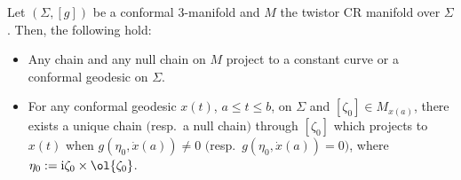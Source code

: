 \begin{Theorem}\label{chain-projection}
Let $(\Sigma, [g])$ be a conformal $3$-manifold and $M$ the twistor CR manifold over $\Sigma$. Then, the following hold:
\begin{itemize}\itemsep=0pt
\item[$(1)$] Any chain and any null chain on $M$ project to a constant curve or a conformal geodesic on $\Sigma$.
\item[$(2)$] For any conformal geodesic $x(t)$, $a\le t\le b$, on $\Sigma$ and $[\zeta_0]\in M_{x(a)}$, there exists a unique chain $($resp.\ a null chain$)$ through $[\zeta_0]$ which projects to $x(t)$ when $g(\eta_0, \dot x(a))\neq0$ $($resp.\ $g(\eta_0, \dot x(a))=0)$, where $\eta_0:= {\rm i}\zeta_0\times \ol{\zeta_0}$.
\end{itemize}
\end{Theorem}

